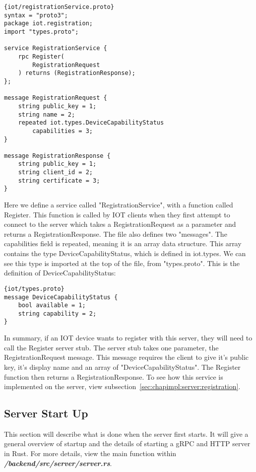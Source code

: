\begin{lstlisting}[language=protobuf3, style=boxed]{iot/registrationService.proto}
syntax = "proto3";
package iot.registration;
import "types.proto";

service RegistrationService {
    rpc Register(
        RegistrationRequest
    ) returns (RegistrationResponse);
};

message RegistrationRequest {
    string public_key = 1;
    string name = 2;
    repeated iot.types.DeviceCapabilityStatus 
        capabilities = 3;
}

message RegistrationResponse {
    string public_key = 1;
    string client_id = 2;
    string certificate = 3;
}
\end{lstlisting}

Here we define a service called "RegistrationService", with a function called Register. This function is called by IOT clients when they first attempt to connect to the server which takes a RegistrationRequest as a parameter and returns a RegistrationResponse. The file also defines two "messages". The capabilities field is repeated, meaning it is an array data structure. This array contains the type DeviceCapabilityStatus, which is defined in iot.types. We can see this type is imported at the top of the file, from "types.proto". This is the definition of DeviceCapabilityStatus:

\begin{lstlisting}[language=protobuf3, style=boxed]{iot/types.proto}
message DeviceCapabilityStatus {
    bool available = 1;
    string capability = 2;
}
\end{lstlisting}

In summary, if an IOT device wants to register with this server, they will need to call the Register server stub. The server stub takes one parameter, the RegistrationRequest message. This message requires the client to give it's public key, it's display name and an array of "DeviceCapabilityStatus". The Register function then returns a RegistrationResponse. To see how this service is implemented on the server, view subsection~\ref{sec:chapimpl:server:registration}.

\subsection{Server Start Up} \label{sec:chapimpl:server:startup}
This section will describe what is done when the server first starts. It will give a general overview of startup and the details of starting a gRPC and HTTP server in Rust. For more details, view the main function within \textit{\textbf{/backend/src/server/server.rs}}.

